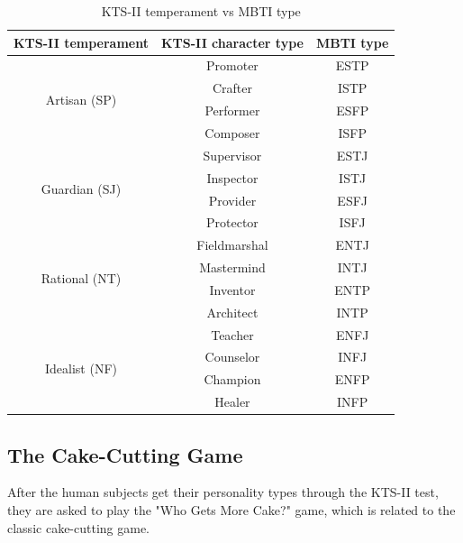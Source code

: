 \begin{table}[!t]
\caption{KTS-II temperament vs MBTI type}
\label{ktsmbti}
\centering
\begin{tabular}{|c|c|c|}
\hline
\textbf{KTS-II temperament} & \textbf{KTS-II character type} & \textbf{MBTI type}\\ \hline
\multirow{4}{*}{Artisan (SP)} & Promoter&ESTP\\ \cline{2-3}
&Crafter&ISTP\\ \cline{2-3}
&Performer & ESFP\\ \cline{2-3}
&Composer & ISFP\\ \hline

\multirow{4}{*}{Guardian (SJ)} & Supervisor & ESTJ\\ \cline{2-3}
&Inspector&ISTJ\\ \cline{2-3}
&Provider & ESFJ\\ \cline{2-3}
&Protector & ISFJ\\ \hline

\multirow{4}{*}{Rational (NT)} & Fieldmarshal&ENTJ\\ \cline{2-3}
&Mastermind & INTJ\\ \cline{2-3}
&Inventor & ENTP\\ \cline{2-3}
&Architect & INTP\\ \hline

\multirow{4}{*}{Idealist (NF)} & Teacher & ENFJ\\ \cline{2-3}
&Counselor & INFJ\\ \cline{2-3}
&Champion & ENFP\\ \cline{2-3}
&Healer & INFP\\ \hline

\end{tabular}
\end{table}

\subsection{The Cake-Cutting Game}
After the human subjects get their personality types through the KTS-II test, they are asked to play the "Who Gets More Cake?" game, which is related to the classic cake-cutting game. 

